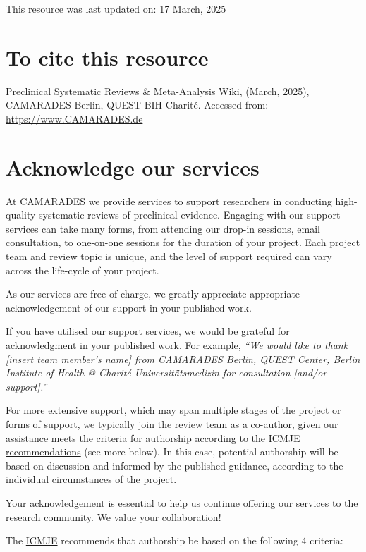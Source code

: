 \documentclass[
]{book}
\begin{document}
This resource was last updated on: 17 March, 2025

\section{To cite this resource}\label{to-cite-this-resource}

Preclinical Systematic Reviews \& Meta-Analysis Wiki, (March, 2025), CAMARADES Berlin, QUEST-BIH Charité. Accessed from: \url{https://www.CAMARADES.de}

\section{Acknowledge our services}\label{acknowledge-our-services}

At CAMARADES we provide services to support researchers in conducting high-quality systematic reviews of preclinical evidence. Engaging with our support services can take many forms, from attending our drop-in sessions, email consultation, to one-on-one sessions for the duration of your project. Each project team and review topic is unique, and the level of support required can vary across the life-cycle of your project.

As our services are free of charge, we greatly appreciate appropriate acknowledgement of our support in your published work.

If you have utilised our support services, we would be grateful for acknowledgment in your published work. For example, \emph{``We would like to thank {[}insert team member's name{]} from CAMARADES Berlin, QUEST Center, Berlin Institute of Health @ Charité Universitätsmedizin for consultation {[}and/or support{]}.''}

For more extensive support, which may span multiple stages of the project or forms of support, we typically join the review team as a co-author, given our assistance meets the criteria for authorship according to the \href{https://www.icmje.org/recommendations/browse/roles-and-responsibilities/defining-the-role-of-authors-and-contributors.html}{ICMJE recommendations} (see more below). In this case, potential authorship will be based on discussion and informed by the published guidance, according to the individual circumstances of the project.

Your acknowledgement is essential to help us continue offering our services to the research community. We value your collaboration!

The \href{https://www.icmje.org/recommendations/browse/roles-and-responsibilities/defining-the-role-of-authors-and-contributors.html}{ICMJE} recommends that authorship be based on the following 4 criteria:
\end{document}
